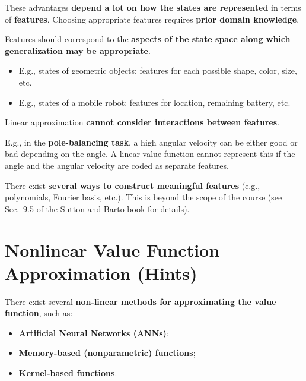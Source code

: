 \documentclass[11pt,a4paper]{article}
\theoremstyle{definition}
\theoremstyle{plain}
\theoremstyle{remark}
\begin{document}
These advantages \textbf{depend a lot on how the states are represented} in terms of \textbf{features}. Choosing appropriate features requires \textbf{prior domain knowledge}.

\begin{tcolorbox}[colback=blue!5!white, colframe=blue!60!black, title={Choosing Features}]
Features should correspond to the \textbf{aspects of the state space along which generalization may be appropriate}.
\begin{itemize}
    \item E.g., states of geometric objects: features for each possible shape, color, size, etc.
    \item E.g., states of a mobile robot: features for location, remaining battery, etc.
\end{itemize}
\end{tcolorbox}

\begin{tcolorbox}[colback=yellow!10!white, colframe=orange!80!black, title={Limitation of Linear Approximation}]
Linear approximation \textbf{cannot consider interactions between features}.

E.g., in the \textbf{pole-balancing task}, a high angular velocity can be either good or bad depending on the angle. A linear value function cannot represent this if the angle and the angular velocity are coded as separate features.
\end{tcolorbox}

There exist \textbf{several ways to construct meaningful features} (e.g., polynomials, Fourier basis, etc.). This is beyond the scope of the course (see Sec.\ 9.5 of the Sutton and Barto book for details).

\section{Nonlinear Value Function Approximation (Hints)}

There exist several \textbf{non-linear methods for approximating the value function}, such as:
\begin{itemize}
    \item \textbf{Artificial Neural Networks (ANNs)};
    \item \textbf{Memory-based (nonparametric) functions};
    \item \textbf{Kernel-based functions}.
\end{itemize}
\end{document}
